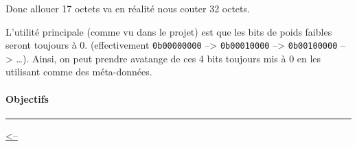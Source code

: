 Donc allouer 17 octets va en réalité nous couter 32 octets.

L'utilité principale (comme vu dans le projet) est que les bits de poids
faibles seront toujours à 0. (effectivement \texttt{0b00000000}
--\textgreater{} \texttt{0b00010000} --\textgreater{}
\texttt{0b00100000} --\textgreater{} \ldots). Ainsi, on peut prendre
avatange de ces 4 bits toujours mis à 0 en les utilisant comme des
méta-données.

\paragraph{Objectifs}\label{objectifs}

\begin{center}\rule{0.5\linewidth}{0.5pt}\end{center}

\href{../README.md}{\textless--}
